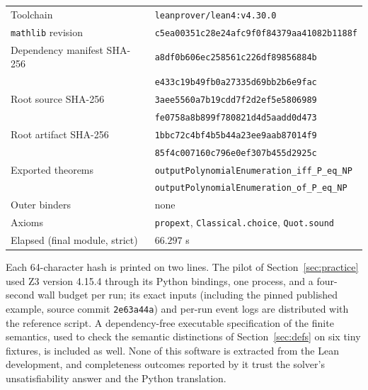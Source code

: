 \documentclass[11pt,a4paper]{article}
\theoremstyle{plain}
\theoremstyle{definition}
\theoremstyle{remark}
\begin{document}
\begin{center}\small
\begin{tabular}{@{}ll@{}}
\toprule
Toolchain & \texttt{leanprover/lean4:v4.30.0}\\
\texttt{mathlib} revision & \texttt{c5ea00351c28e24afc9f0f84379aa41082b1188f}\\
Dependency manifest SHA-256 & \texttt{a8df0b606ec258561c226df89856884b}\\
 & \texttt{e433c19b49fb0a27335d69bb2b6e9fac}\\
Root source SHA-256 & \texttt{3aee5560a7b19cdd7f2d2ef5e5806989}\\
 & \texttt{fe0758a8b899f780821d4d5aadd0d473}\\
Root artifact SHA-256 & \texttt{1bbc72c4bf4b5b44a23ee9aab87014f9}\\
 & \texttt{85f4c007160c796e0ef307b455d2925c}\\
Exported theorems & \texttt{outputPolynomialEnumeration\_iff\_P\_eq\_NP}\\
 & \texttt{outputPolynomialEnumeration\_of\_P\_eq\_NP}\\
Outer binders & none\\
Axioms & \texttt{propext}, \texttt{Classical.choice}, \texttt{Quot.sound}\\
Elapsed (final module, strict) & $66.297$ s\\
\bottomrule
\end{tabular}
\end{center}
Each 64-character hash is printed on two lines.
The pilot of Section~\ref{sec:practice} used Z3 version 4.15.4 through its Python bindings, one process, and a four-second wall budget per run; its exact inputs (including the pinned published example, source commit \texttt{2e63a44a}) and per-run event logs are distributed with the reference script. A dependency-free executable specification of the finite semantics, used to check the semantic distinctions of Section~\ref{sec:defs} on six tiny fixtures, is included as well. None of this software is extracted from the Lean development, and completeness outcomes reported by it trust the solver's unsatisfiability answer and the Python translation.



\end{document}
